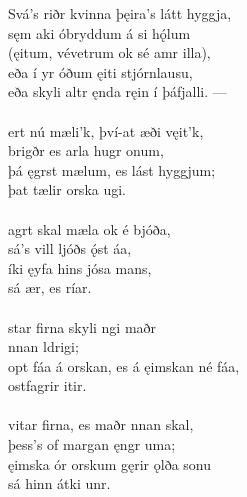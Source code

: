 \bva Svá's riðr kvinna \hld þęira's látt hyggja, \\%
sęm aki  óbryddum \hld á si hǫ́lum \\%
(ęitum, vévetrum \hld ok sé amr illa), \\%
eða í yr óðum \hld {}ęiti stjórnlausu, \\%
eða skyli altr ęnda \hld {}ręin í þáfjalli. —\\%

 \\

\bva {}ert nú mæli'k, \hld því-at æði vęit'k, \\%
\ind brigðr es arla hugr onum, \\%
þá ęgrst mælum, \hld es lást hyggjum; \\%
\ind þat tælir orska ugi.\\%

 \\

\bva {}agrt skal mæla \hld ok é bjóða, \\%
\ind sá's vill ljóðs ǫ́st áa, \\%
íki ęyfa \hld hins jósa mans, \\%
\ind sá ær, es ríar.\\%

 \\

\bva {}star firna \hld skyli ngi maðr \\%
\ind {}nnan ldrigi; \\%
opt fáa á orskan, \hld es á ęimskan né fáa, \\%
\ind {}ostfagrir itir.\\%

 \\

\bva {}vitar firna, \hld es maðr nnan skal, \\%
\ind þess's of margan ęngr uma; \\%
ęimska ór orskum \hld gęrir ǫlða sonu \\%
\ind sá hinn átki unr.\\%

 \\

